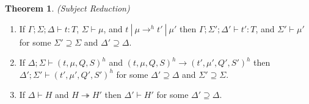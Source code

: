\documentclass{article}
\theoremstyle{definition}
\newtheorem{thm}{Theorem}[section]
\begin{document}
\begin{thm}
\emph{(Subject Reduction)}\label{th:pres}

\begin{enumerate}

\item If $\Gamma ; \Sigma ; \Delta \vdash t : T$, $\Sigma \vdash \mu$, and $t~|~\mu \rightarrow^h t'~|~\mu'$ then $\Gamma ; \Sigma' ; \Delta' \vdash t' : T$, and $\Sigma' \vdash \mu'$ for some $\Sigma' \supseteq \Sigma$ and $\Delta' \supseteq \Delta$.

\item If $\Delta ; \Sigma \vdash (t, \mu, Q, S)^h$ and $(t, \mu, Q, S)^h \longrightarrow (t', \mu', Q', S')^h$ then $\Delta' ; \Sigma' \vdash (t', \mu', Q', S')^h$ for some $\Delta' \supseteq \Delta$ and $\Sigma' \supseteq \Sigma$.

\item If $\Delta \vdash H$ and $H \twoheadrightarrow H'$ then $\Delta' \vdash H'$ for some $\Delta' \supseteq \Delta$.

\end{enumerate}

\end{thm}
\end{document}

